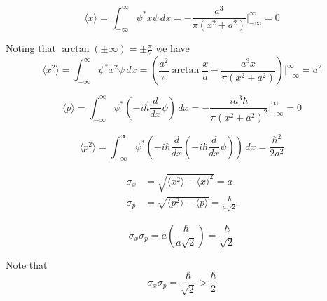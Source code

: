


\bigskip
\begin{equation*}
\langle x\rangle=\int_{-\infty}^\infty\psi^*x\psi\,dx
=-\frac{a^3}{\pi(x^2+a^2)}\bigg|_{-\infty}^\infty=0
\end{equation*}

Noting that $\arctan(\pm\infty)=\pm\frac{\pi}{2}$ we have
\begin{equation*}
\langle x^2\rangle=\int_{-\infty}^\infty\psi^*x^2\psi\,dx
=\left(\frac{a^2}{\pi}\arctan\frac{x}{a}
-\frac{a^3x}{\pi(x^2+a^2)}\right)\bigg|_{-\infty}^\infty
=a^2
\end{equation*}

\begin{equation*}
\langle p\rangle
=\int_{-\infty}^\infty\psi^*\left(-i\hbar\frac{d}{dx}\psi\right)\,dx
=-\frac{ia^3\hbar}{\pi\left(x^2+a^2\right)^2}\bigg|_{-\infty}^\infty
=0
\end{equation*}

\begin{equation*}
\langle p^2\rangle
=\int_{-\infty}^\infty\psi^*\left(-i\hbar\frac{d}{dx}
\left(-i\hbar\frac{d}{dx}\psi\right)\right)\,dx
=\frac{\hbar^2}{2a^2}
\end{equation*}

\begin{align*}
\sigma_x&=\sqrt{\langle x^2\rangle-\langle x\rangle^2}=a
\\
\sigma_p&=\sqrt{\langle p^2\rangle-\langle p\rangle}
=\frac{\hbar}{a\sqrt2}
\end{align*}

\begin{equation*}
\sigma_x\sigma_p=a\left(\frac{\hbar}{a\sqrt2}\right)
=\frac{\hbar}{\sqrt2}
\end{equation*}

Note that
\begin{equation*}
\sigma_x\sigma_p=\frac{\hbar}{\sqrt2}>\frac{\hbar}{2}
\end{equation*}


